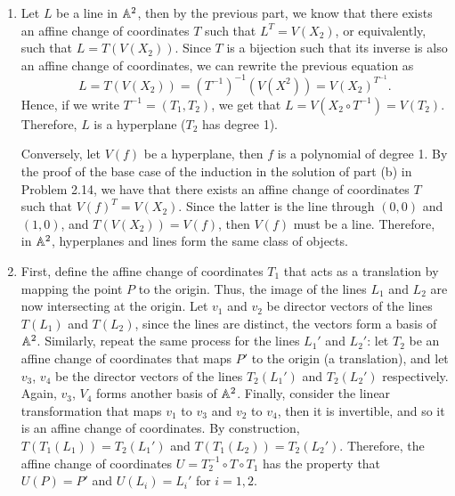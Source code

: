 \begin{solution}
\begin{enumerate}
        Conversely, let $L$ be a linear subvariety of dimension 1, then there is an affine change of coordinates $T$, such that $L^T = V(X_2, ..., X_n)$, or equivalently, such that $L = T(V(X_2, ..., X_n))$. Let $P$ and $Q$ be two points in $L$, then there are two points $(p, 0, ..., 0), (q, 0, ..., 0) \in V(X_2, ..., X_n)$ that are the respective preimages of these two points. Since $P$ and $Q$ are distinct, and $T$ is a bijection, then $p$ and $q$ are also distinct. Hence, we can easily see that $V(X_2, ..., X_n)$ can be described as the line $L_0$ through the vectors $(p, 0, ..., 0)$ and  $(q, 0, ..., 0)$. Finally, using part (a), we get that $L = T(L_0)$ must be the line through the points $P$ and $Q$. Since $P \neq Q$ were arbitrary points on $L$, then we can say that a linear subvariety fo dimension 1 is the line through any two of its points.
        \item Let $L$ be a line in $\mathbb{A}^2$, then by the previous part, we know that there exists an affine change of coordinates $T$ such that $L^T = V(X_2)$, or equivalently, such that $L = T(V(X_2))$. Since $T$ is a bijection such that its inverse is also an affine change of coordinates, we can rewrite the previous equation as
        $$L = T(V(X_2)) = (T^{-1})^{-1}(V(X^2)) = V(X_2)^{T^{-1}}.$$
        Hence, if we write $T^{-1} = (T_1, T_2)$, we get that $L = V(X_2 \circ T^{-1}) = V(T_2)$. Therefore, $L$ is a hyperplane ($T_2$ has degree 1). 

        Conversely, let $V(f)$ be a hyperplane, then $f$ is a polynomial of degree 1. By the proof of the base case of the induction in the solution of part (b) in Problem 2.14, we have that there exists an affine change of coordinates $T$ such that $V(f)^T = V(X_2)$. Since the latter is the line through $(0,0)$ and $(1,0)$, and $T(V(X_2)) = V(f)$, then $V(f)$ must be a line. Therefore, in $\mathbb{A}^2$, hyperplanes and lines form the same class of objects.
        \item First, define the affine change of coordinates $T_1$ that acts as a translation by mapping the point $P$ to the origin. Thus, the image of the lines $L_1$ and $L_2$ are now intersecting at the origin. Let $v_1$ and $v_2$ be director vectors of the lines $T(L_1)$ and $T(L_2)$, since the lines are distinct, the vectors form a basis of $\mathbb{A}^2$. Similarly, repeat the same process for the lines $L_1'$ and $L_2'$: let $T_2$ be an affine change of coordinates that maps $P'$ to the origin (a translation), and let $v_3$, $v_4$ be the director vectors of the lines $T_2(L_1')$ and $T_2(L_2')$ respectively. Again, $v_3$, $V_4$ forms another basis of $\mathbb{A}^2$. Finally, consider the linear transformation that maps $v_1$ to $v_3$ and $v_2$ to $v_4$, then it is invertible, and so it is an affine change of coordinates. By construction, $T(T_1(L_1)) = T_2(L_1')$ and $T(T_1(L_2)) = T_2(L_2')$. Therefore, the affine change of coordinates $U = T_2^{-1}\circ T \circ T_1$ has the property that $U(P) = P'$ and $U(L_i) = L_i'$ for $i = 1,2$. \\
    \end{enumerate}
\end{solution}

